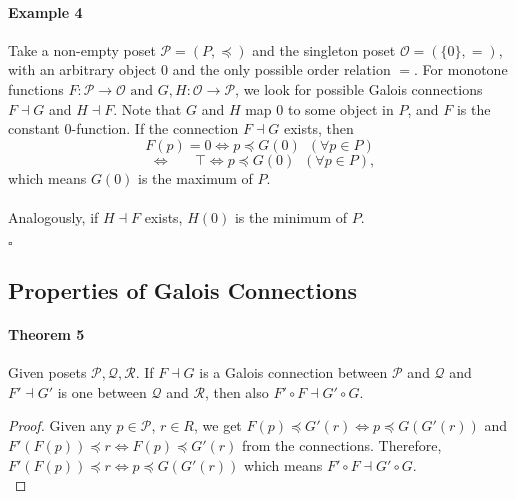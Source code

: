 \paragraph{Example 4}
	Take a non-empty poset $\mathcal{P} = (P, \preceq)$ and the singleton poset $\mathcal{O} = (\{0\}, =)$, with an arbitrary object $0$ and the only possible order relation  $ =$. 
	For monotone functions $F: \mathcal{P} \to \mathcal{O} \text{ and } G, H: \mathcal{O} \to \mathcal{P}$, we look for possible Galois connections $F \dashv G$ and $H \dashv F.$
	Note that $G$ and $H$ map $0$ to some object in $P$, and $F$ is the constant $0$-function.
	If the connection $F \dashv G$ exists, then \[F(p)  = 0   \Leftrightarrow   p  \preceq  G(0) \,\,\,(\forall p \in P)\]
	\[\;\,\Leftrightarrow\;\;\;\;\;\;\top \Leftrightarrow p   \preceq  G(0) \;\;(\forall p \in P),\]
	which means $G(0)$ is the maximum of $P$.\\\\
	Analogously, if $H \dashv F$ exists, $H(0)$ is the minimum of $P$.  {\begin{flushright}$\square$\end{flushright}}\vspace{\baselineskip}

\subsection*{Properties of Galois Connections}

\paragraph{Theorem 5} 
	Given posets $\mathcal P, \mathcal Q, \mathcal R$. If $F \dashv G$ is a Galois connection between $\mathcal P$ and $\mathcal Q$ and $F' \dashv G'$ is one between  $\mathcal Q$ and $\mathcal R$, then also $F'\circ F \dashv G' \circ G$. 
\begin{proof}
		Given any $p \in \mathcal P$, $r \in R$, we get $F(p) \preceq G'(r) \Leftrightarrow p \preceq G(G'(r))$ and $F'(F(p)) \preceq r \Leftrightarrow F(p) \preceq G'(r)$  from the connections. Therefore, $F'(F(p)) \preceq r \Leftrightarrow p \preceq G(G'(r))$ which means $F'\circ F \dashv G' \circ G$.\\
	\end{proof}
\vspace{\baselineskip}
